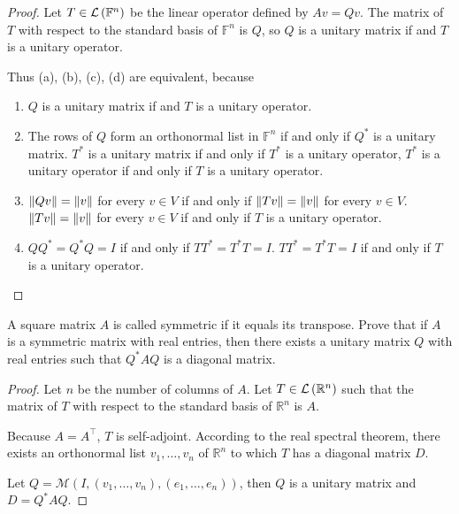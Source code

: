 \begin{proof}
    Let $T\in\mathcal{L}\left({\mathbb{F}^{n}}\right)$ be the linear operator defined by $Av = Qv$. The matrix of $T$ with respect to the standard basis of $\mathbb{F}^{n}$ is $Q$, so $Q$ is a unitary matrix if and $T$ is a unitary operator.

    Thus (a), (b), (c), (d) are equivalent, because
    \begin{enumerate}[label={(\alph*)}]
        \item $Q$ is a unitary matrix if and $T$ is a unitary operator.
        \item The rows of $Q$ form an orthonormal list in $\mathbb{F}^{n}$ if and only if $Q^{*}$ is a unitary matrix. $T^{*}$ is a unitary matrix if and only if $T^{*}$ is a unitary operator, $T^{*}$ is a unitary operator if and only if $T$ is a unitary operator.
        \item $\left\Vert{Qv}\right\Vert = \left\Vert{v}\right\Vert$ for every $v\in V$ if and only if $\left\Vert{Tv}\right\Vert = \left\Vert{v}\right\Vert$ for every $v\in V$. $\left\Vert{Tv}\right\Vert = \left\Vert{v}\right\Vert$ for every $v\in V$ if and only if $T$ is a unitary operator.
        \item $QQ^{*} = Q^{*}Q = I$ if and only if $TT^{*} = T^{*}T = I$. $TT^{*} = T^{*}T = I$ if and only if $T$ is a unitary operator.
    \end{enumerate}
\end{proof}
\newpage

\begin{exercise}
    A square matrix $A$ is called symmetric if it equals its transpose. Prove that if $A$ is a symmetric matrix with real entries, then there exists a unitary matrix $Q$ with real entries such that $Q^{*}AQ$ is a diagonal matrix.
\end{exercise}

\begin{proof}
    Let $n$ be the number of columns of $A$. Let $T\in\mathcal{L}\left({\mathbb{R}^{n}}\right)$ such that the matrix of $T$ with respect to the standard basis of $\mathbb{R}^{n}$ is $A$.

    Because $A = A^{\top}$, $T$ is self-adjoint. According to the real spectral theorem, there exists an orthonormal list $v_{1}, \ldots, v_{n}$ of $\mathbb{R}^{n}$ to which $T$ has a diagonal matrix $D$.

    Let $Q = \mathcal{M}(I, (v_{1}, \ldots, v_{n}), (e_{1}, \ldots, e_{n}))$, then $Q$ is a unitary matrix and $D = Q^{*}AQ$.
\end{proof}
\newpage

